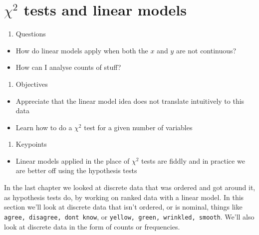 \documentclass[
]{book}
\providecommand{\tightlist}{%
  \setlength{\itemsep}{0pt}\setlength{\parskip}{0pt}}
\begin{document}
\hypertarget{chi-2-tests-and-linear-models}{%
\chapter{\texorpdfstring{\(\chi ^2\) tests and linear models}{\textbackslash chi \^{}2 tests and linear models}}\label{chi-2-tests-and-linear-models}}

\begin{enumerate}
\def\labelenumi{\arabic{enumi}.}
\tightlist
\item
  Questions
\end{enumerate}

\begin{itemize}
\tightlist
\item
  How do linear models apply when both the \(x\) and \(y\) are not continuous?
\item
  How can I analyse counts of stuff?
\end{itemize}

\begin{enumerate}
\def\labelenumi{\arabic{enumi}.}
\setcounter{enumi}{1}
\tightlist
\item
  Objectives
\end{enumerate}

\begin{itemize}
\tightlist
\item
  Appreciate that the linear model idea does not translate intuitively to this data
\item
  Learn how to do a \(\chi^2\) test for a given number of variables
\end{itemize}

\begin{enumerate}
\def\labelenumi{\arabic{enumi}.}
\setcounter{enumi}{2}
\tightlist
\item
  Keypoints
\end{enumerate}

\begin{itemize}
\tightlist
\item
  Linear models applied in the place of \(\chi^2\) tests are fiddly and in practice we are better off using the hypothesis tests
\end{itemize}

In the last chapter we looked at discrete data that was ordered and got around it, as hypothesis tests do, by working on ranked data with a linear model. In this section we'll look at discrete data that isn't ordered, or is nominal, things like \texttt{agree,\ disagree,\ don\textquotesingle{}t\ know}, or \texttt{yellow,\ green,\ wrinkled,\ smooth}. We'll also look at discrete data in the form of counts or frequencies.
\end{document}
